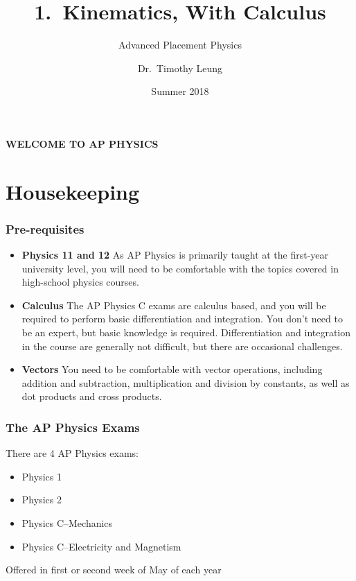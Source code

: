 \documentclass[12pt,compress,aspectratio=169]{beamer}
\title{1.\ Kinematics, With Calculus}
\subtitle{Advanced Placement Physics}
\author[TML]{Dr.\ Timothy Leung}
\institute{Olympiads School}
\date{Summer 2018}
\begin{document}
\begin{frame}
  \frametitle{}
  {\LARGE
    \begin{center}
      \textbf{WELCOME TO AP PHYSICS}
    \end{center}
  }
\end{frame}


\section{Housekeeping}


\begin{frame}
  \frametitle{Pre-requisites}
  \begin{itemize}
  \item\textbf{Physics 11 and 12} As AP Physics is primarily taught at the
    first-year university level, you will need to be comfortable with the
    topics covered in high-school physics courses.
  \item\textbf{Calculus} The AP Physics C exams are calculus based, and you
    will be required to perform basic differentiation and integration. You
    don't need to be an expert, but basic knowledge is required.
    Differentiation and integration in the course are generally not
    difficult, but there are occasional challenges.
  \item\textbf{Vectors} You need to be comfortable with vector operations,
    including addition and subtraction, multiplication and division by
    constants, as well as dot products and cross products.
  \end{itemize}
\end{frame}



\begin{frame}
  \frametitle{The AP Physics Exams}
  There are 4 AP Physics exams:
  \begin{itemize}
  \item Physics 1
  \item Physics 2
  \item Physics C--Mechanics
  \item Physics C--Electricity and Magnetism
  \end{itemize}
  Offered in first or second week of May of each year
\end{frame}
\end{document}
